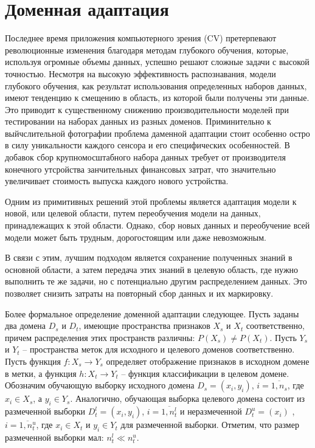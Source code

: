 \section{Доменная адаптация}\label{sect-3}

Последнее время приложения компьютерного зрения (CV) претерпевают революционные изменения благодаря методам глубокого обучения, которые, используя огромные объемы данных, успешно решают сложные задачи с высокой точностью. Несмотря на высокую эффективность распознавания, модели глубокого обучения, как результат использования определенных наборов данных, имеют тенденцию к смещению в область, из которой были получены эти данные. Это приводит к существенному снижению производительности моделей при тестировании на наборах данных из разных доменов. Приминительно к выйчслительной фотографии проблема даменной адаптации стоит особенно остро в силу уникальности каждого сенсора и его специфических особенностей. В добавок сбор крупномосштабного набора данных требует от производителя конечного утсройства занчительных финансовых затрат, что значительно увеличивает стоимость выпуска каждого нового устройства.

Одним из примитивных решений этой проблемы является адаптация модели к новой, или целевой области, путем переобучения модели на данных, принадлежащих к этой области. Однако, сбор новых данных и переобучение всей модели может быть трудным, дорогостоящим или даже невозможным. 

В связи с этим, лучшим подходом является сохранение полученных знаний в основной области, а затем передача этих знаний в целевую область, где нужно выполнить те же задачи, но с потенциально другим распределением данных. Это позволяет снизить затраты на повторный сбор данных и их маркировку.


Более формальное определение доменной адаптации следующее. Пусть заданы два домена $D_s$ и $D_t$, имеющие пространства признаков $X_s$ и $X_t$ соответственно, причем распределения этих пространств различны: $P(X_s) \neq P(X_t)$. Пусть $Y_s$ и $Y_t$ -- пространства меток для исходного и целевого доменов соответственно. Пусть функция $f: X_s \rightarrow Y_s$ определяет отображение признаков в исходном домене в метки, а функция $h: X_t \rightarrow Y_t$ -- функция классификации в целевом домене. Обозначим обучающую выборку исходного домена $D_s = (x_i, y_i)$, $i=\overline{1, n_s}$, где $x_i \in X_s$, а $y_i \in Y_s$. Аналогично, обучающая выборка целевого домена состоит из размеченной выборки $D_t^l =(x_i, y_i)$, $i=\overline{1, n_t^l}$ и неразмеченной $D_t^u = (x_i)$ , $i=\overline{1, n_t^u}$, где $x_i \in X_t$ и $y_i \in Y_t$ для размеченной выборки. Отметим, что размер размеченной выборки мал: $n_t^l \ll n_t^u$. 

